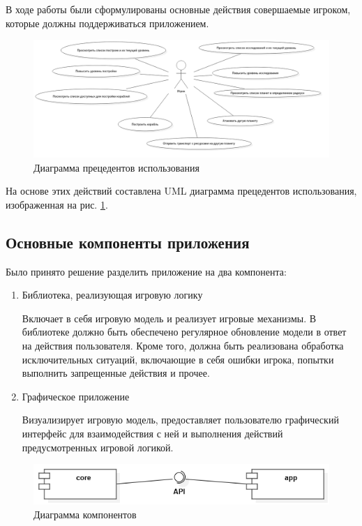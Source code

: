 В ходе работы были сформулированы основные действия совершаемые игроком, которые должны поддерживаться приложением. 
\begin{figure}[H]
	\begin{center}
		\includegraphics[scale=0.35]{../../uml/UseCaseDiagram1.png}
		\caption{Диаграмма прецедентов использования}
		\label{pic:use_case}
	\end{center}
\end{figure}

На основе этих действий составлена UML диаграмма прецедентов использования, изображенная на рис. \ref{pic:use_case}.

\subsection{Основные компоненты приложения}

Было принято решение разделить приложение на два компонента:

\begin{enumerate}
	\item Библиотека, реализующая игровую логику
		
	 Включает в себя игровую модель и реализует игровые механизмы. В библиотеке должно быть обеспечено регулярное обновление модели в ответ на действия пользователя. Кроме того, должна быть реализована обработка исключительных ситуаций, включающие в себя ошибки игрока, попытки выполнить запрещенные действия и прочее. 	 
	
	\item Графическое приложение 

	Визуализирует игровую модель, предоставляет пользователю графический интерфейс для взаимодействия с ней и выполнения действий предусмотренных игровой логикой.
\end{enumerate}

\begin{figure}[H]
	\begin{center}
		\includegraphics[scale=0.7]{../../uml/ComponentDiagram1.png}
		\caption{Диаграмма компонентов}
		\label{pic:components}
	\end{center}
\end{figure}

